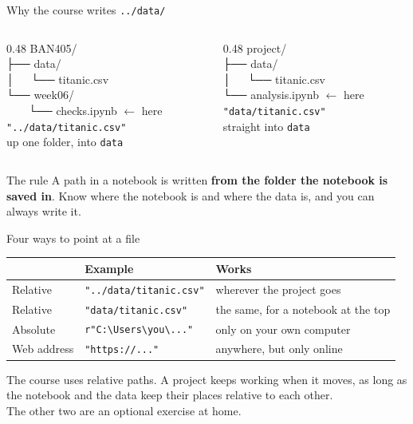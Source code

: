 \documentclass[aspectratio=169,11pt]{beamer}
\newcommand{\code}[1]{\texttt{#1}}
\begin{document}
\begin{frame}{Why the course writes \code{../data/}}
  \begin{columns}[T]
    \begin{column}{0.48\textwidth}
      \ttfamily\small
      BAN405/\\
      ├── data/\\
      │\ \ \ └── titanic.csv\\
      └── week06/\\
      \ \ \ \ └── checks.ipynb \textcolor{ban}{$\leftarrow$ here}\\[0.6em]
      \normalfont\normalsize
      \code{"../data/titanic.csv"}\\
      {\small up one folder, into \code{data}}
    \end{column}
    \begin{column}{0.48\textwidth}
      \ttfamily\small
      project/\\
      ├── data/\\
      │\ \ \ └── titanic.csv\\
      └── analysis.ipynb \textcolor{ban}{$\leftarrow$ here}\\[2.05em]
      \normalfont\normalsize
      \code{"data/titanic.csv"}\\
      {\small straight into \code{data}}
    \end{column}
  \end{columns}
  \vspace{1em}
  \begin{block}{The rule}
    A path in a notebook is written \textbf{from the folder the notebook is saved in}. Know where the notebook is and where the data is, and you can always write it.
  \end{block}
\end{frame}

\begin{frame}{Four ways to point at a file}
  \centering
  \begin{tabular}{l l l}
    & \textbf{Example} & \textbf{Works} \\ \hline
    Relative & \code{"../data/titanic.csv"} & wherever the project goes \\
    Relative & \code{"data/titanic.csv"} & the same, for a notebook at the top \\
    Absolute & \code{r"C:\textbackslash Users\textbackslash you\textbackslash ..."} & \alert{only on your own computer} \\
    Web address & \code{"https://..."} & anywhere, \alert{but only online} \\
  \end{tabular}

  \vspace{1.2em}
  \raggedright
  The course uses relative paths. A project keeps working when it moves, as long as the notebook and the data keep their places relative to each other.\\[0.4em]
  {\small The other two are an optional exercise at home.}
\end{frame}
\end{document}
